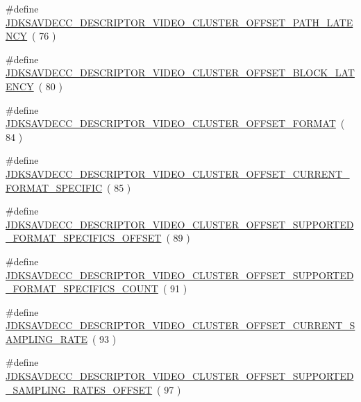 \begin{DoxyCompactItemize}
\#define \hyperlink{group__descriptor__video__cluster_gab07bbbbc3bef4ff8c740b08ad93deb7c}{J\+D\+K\+S\+A\+V\+D\+E\+C\+C\+\_\+\+D\+E\+S\+C\+R\+I\+P\+T\+O\+R\+\_\+\+V\+I\+D\+E\+O\+\_\+\+C\+L\+U\+S\+T\+E\+R\+\_\+\+O\+F\+F\+S\+E\+T\+\_\+\+P\+A\+T\+H\+\_\+\+L\+A\+T\+E\+N\+CY}~( 76 )
\item 
\#define \hyperlink{group__descriptor__video__cluster_gaf9c0cc92b56856d260479239856ecd50}{J\+D\+K\+S\+A\+V\+D\+E\+C\+C\+\_\+\+D\+E\+S\+C\+R\+I\+P\+T\+O\+R\+\_\+\+V\+I\+D\+E\+O\+\_\+\+C\+L\+U\+S\+T\+E\+R\+\_\+\+O\+F\+F\+S\+E\+T\+\_\+\+B\+L\+O\+C\+K\+\_\+\+L\+A\+T\+E\+N\+CY}~( 80 )
\item 
\#define \hyperlink{group__descriptor__video__cluster_ga55a5da2deb40819f7cc985d112355fa5}{J\+D\+K\+S\+A\+V\+D\+E\+C\+C\+\_\+\+D\+E\+S\+C\+R\+I\+P\+T\+O\+R\+\_\+\+V\+I\+D\+E\+O\+\_\+\+C\+L\+U\+S\+T\+E\+R\+\_\+\+O\+F\+F\+S\+E\+T\+\_\+\+F\+O\+R\+M\+AT}~( 84 )
\item 
\#define \hyperlink{group__descriptor__video__cluster_ga788042cf293f2284ece4f1f05d9d49c5}{J\+D\+K\+S\+A\+V\+D\+E\+C\+C\+\_\+\+D\+E\+S\+C\+R\+I\+P\+T\+O\+R\+\_\+\+V\+I\+D\+E\+O\+\_\+\+C\+L\+U\+S\+T\+E\+R\+\_\+\+O\+F\+F\+S\+E\+T\+\_\+\+C\+U\+R\+R\+E\+N\+T\+\_\+\+F\+O\+R\+M\+A\+T\+\_\+\+S\+P\+E\+C\+I\+F\+IC}~( 85 )
\item 
\#define \hyperlink{group__descriptor__video__cluster_ga227d117b9e60ed31e29cc10373d25f24}{J\+D\+K\+S\+A\+V\+D\+E\+C\+C\+\_\+\+D\+E\+S\+C\+R\+I\+P\+T\+O\+R\+\_\+\+V\+I\+D\+E\+O\+\_\+\+C\+L\+U\+S\+T\+E\+R\+\_\+\+O\+F\+F\+S\+E\+T\+\_\+\+S\+U\+P\+P\+O\+R\+T\+E\+D\+\_\+\+F\+O\+R\+M\+A\+T\+\_\+\+S\+P\+E\+C\+I\+F\+I\+C\+S\+\_\+\+O\+F\+F\+S\+ET}~( 89 )
\item 
\#define \hyperlink{group__descriptor__video__cluster_gae192b6b5e087a9bad62b57e36c1e4b25}{J\+D\+K\+S\+A\+V\+D\+E\+C\+C\+\_\+\+D\+E\+S\+C\+R\+I\+P\+T\+O\+R\+\_\+\+V\+I\+D\+E\+O\+\_\+\+C\+L\+U\+S\+T\+E\+R\+\_\+\+O\+F\+F\+S\+E\+T\+\_\+\+S\+U\+P\+P\+O\+R\+T\+E\+D\+\_\+\+F\+O\+R\+M\+A\+T\+\_\+\+S\+P\+E\+C\+I\+F\+I\+C\+S\+\_\+\+C\+O\+U\+NT}~( 91 )
\item 
\#define \hyperlink{group__descriptor__video__cluster_ga32d840049da40ec640056a46cb6ec572}{J\+D\+K\+S\+A\+V\+D\+E\+C\+C\+\_\+\+D\+E\+S\+C\+R\+I\+P\+T\+O\+R\+\_\+\+V\+I\+D\+E\+O\+\_\+\+C\+L\+U\+S\+T\+E\+R\+\_\+\+O\+F\+F\+S\+E\+T\+\_\+\+C\+U\+R\+R\+E\+N\+T\+\_\+\+S\+A\+M\+P\+L\+I\+N\+G\+\_\+\+R\+A\+TE}~( 93 )
\item 
\#define \hyperlink{group__descriptor__video__cluster_gada17a9b6607c9ff0dc0eb76a213ccbfb}{J\+D\+K\+S\+A\+V\+D\+E\+C\+C\+\_\+\+D\+E\+S\+C\+R\+I\+P\+T\+O\+R\+\_\+\+V\+I\+D\+E\+O\+\_\+\+C\+L\+U\+S\+T\+E\+R\+\_\+\+O\+F\+F\+S\+E\+T\+\_\+\+S\+U\+P\+P\+O\+R\+T\+E\+D\+\_\+\+S\+A\+M\+P\+L\+I\+N\+G\+\_\+\+R\+A\+T\+E\+S\+\_\+\+O\+F\+F\+S\+ET}~( 97 )

\end{DoxyCompactItemize}

